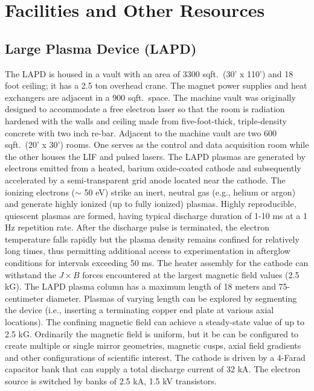 \documentclass[11pt]{article}
\date{}
\title{}
\begin{document}
\section{Facilities and Other Resources}

\subsection{Large Plasma Device ({LAPD})}
The LAPD  is housed in a vault with an area of 3300 sqft.\ (30' x 110') and 18 foot ceiling; it has a 2.5 ton overhead crane.  The magnet power supplies and heat exchangers are adjacent in a 900 sqft.\ space.  The machine vault was originally designed to accommodate a free electron laser so that the room is radiation hardened with the walls and ceiling made from five-foot-thick, triple-density concrete with two inch re-bar.  Adjacent to the machine vault are two 600 sqft.\ (20' x 30') rooms.  One serves as the control and data acquisition room while the other houses the LIF and pulsed lasers.
	The LAPD plasmas are generated by electrons emitted from a heated, barium oxide-coated cathode and subsequently accelerated by a semi-transparent grid anode located near the cathode.  The ionizing electrons ($\sim$ 50 eV) strike an inert, neutral gas (e.g., helium or argon) and generate highly ionized (up to fully ionized) plasmas. Highly reproducible, quiescent plasmas are formed, having typical discharge duration of 1-10 ms at a 1 Hz repetition rate.  After the discharge pulse is terminated, the electron temperature falls rapidly but the plasma density remains confined for relatively long times, thus permitting additional access to experimentation in afterglow conditions for intervals exceeding 50 ms. The heater assembly for the cathode can withstand the $J\times B$ forces encountered at the largest magnetic field values (2.5 kG).
	The LAPD plasma column has a maximum length of 18 meters and 75-centimeter diameter.  Plasmas of varying length can be explored by segmenting the device (i.e., inserting a terminating copper end plate at various axial locations).  The confining magnetic field can achieve a steady-state value of up to 2.5  kG.  Ordinarily the magnetic field is uniform, but it be can be configured to create multiple or single mirror geometries, magnetic cusps, axial field gradients and other configurations of scientific interest.  The cathode is driven by a 4-Farad capacitor bank that can supply a total discharge current of 32 kA.  The electron source is switched by banks of 2.5 kA, 1.5 kV transistors. 
	
\end{document}
